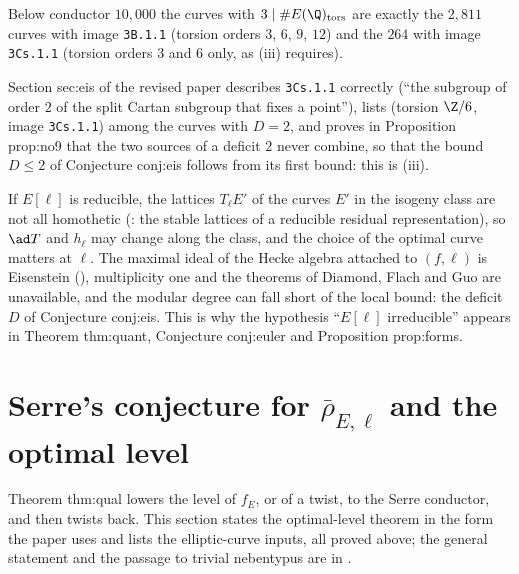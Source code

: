 Below conductor $10{,}000$ the curves with $3\mid\#E(\Q)_{\mathrm{tors}}$ are exactly the $2{,}811$ curves with image \texttt{3B.1.1} (torsion orders $3$, $6$, $9$, $12$)
and the $264$ with image \texttt{3Cs.1.1} (torsion orders $3$ and $6$ only, as (iii) requires).

\begin{paperlink}
Section sec:eis of the revised paper describes \texttt{3Cs.1.1} correctly (``the subgroup of order $2$ of the split Cartan subgroup that fixes a
point''), lists  (torsion $\Z/6$, image \texttt{3Cs.1.1}) among the curves with $D=2$, and proves in Proposition prop:no9 that the two sources of a
deficit $2$ never combine, so that the bound $D\le2$ of Conjecture conj:eis follows from its first bound: this is (iii).
\end{paperlink}

\begin{remark}\label{rem:galrep:eisenstein}
If $E[\ell]$ is reducible, the lattices $T_\ell E'$ of the curves $E'$ in the isogeny class are not all homothetic (: the stable lattices of a
reducible residual representation), so $\ad T$ and $h_\ell$ may change along the class, and the choice of the optimal curve matters at $\ell$. The
maximal ideal of the Hecke algebra attached to $(f,\ell)$ is Eisenstein (), multiplicity one and the theorems of Diamond, Flach and
Guo are unavailable, and the modular degree can fall short of the local bound: the deficit $D$ of Conjecture conj:eis. This is why the
hypothesis ``$E[\ell]$ irreducible'' appears in Theorem thm:quant, Conjecture conj:euler and Proposition prop:forms.
\end{remark}

\section[Serre's conjecture and the optimal level]{Serre's conjecture for \texorpdfstring{$\bar\rho_{E,\ell}$}{rhobar} and the optimal level}\label{sec:galrep:serre}

Theorem thm:qual lowers the level of $f_E$, or of a twist, to the Serre conductor, and then twists back. This section states the optimal-level
theorem in the form the paper uses and lists the elliptic-curve inputs, all proved above; the general statement and the passage to trivial
nebentypus are in .

